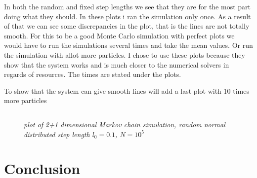 \documentclass[english,a4paper,12pt]{article}
\begin{document}
In both the random and fixed step lengths we see that they are for the most part doing what they should. In these plots i ran the 
simulation only once. As a result of that we can see some discrepancies in the plot, that is the lines are not totally smooth. 
For this to be a good Monte Carlo simulation with perfect plots we would have to run the simulations several times and take the mean values. Or run the simulation
with allot more particles. I chose to use these plots because they show that the system works and is much closer to the numerical solvers
in regards of resources. The times are stated under the plots.

To show that the system can give smooth lines will add a last plot with 10 times more particles

\subsection*{}
\begin{figure}[H]
 \begin{center}
 \end{center}
 \caption{\textit{plot of 2+1 dimensional Markov chain simulation, random normal distributed step length $l_0 = 0.1$, $N=10^5$}}
 \label{fig:edge}
\end{figure}


\section*{Conclusion}
\end{document}
